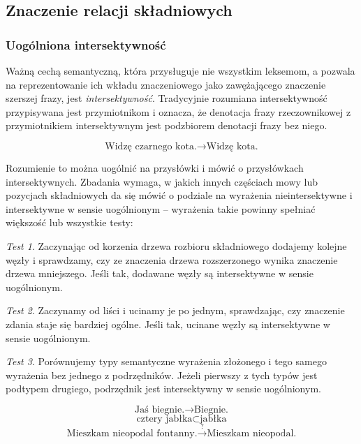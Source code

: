 \documentclass[a4paper, 12pt]{article}
\theoremstyle{remark}
\newtheorem{test}{Test}
\begin{document}
\subsection{Znaczenie relacji składniowych} %

\subsubsection{Uogólniona intersektywność} %
\label{uog_interektywnosc}
Ważną cechą semantyczną, która przysługuje nie wszystkim leksemom, a pozwala na reprezentowanie ich wkładu znaczeniowego jako zawężającego znaczenie szerszej frazy, jest \emph{intersektywność}.
Tradycyjnie rozumiana intersektywność przypisywana jest przymiotnikom i oznacza, że denotacja frazy rzeczownikowej z przymiotnikiem intersektywnym jest podzbiorem denotacji frazy bez niego.

\begin{equation}
\text{Widzę czarnego kota.} \rightarrow \text{Widzę kota.}
\end{equation}


Rozumienie to można uogólnić na przysłówki i mówić o przysłówkach intersektywnych. Zbadania wymaga, w jakich innych częściach mowy lub pozycjach składniowych da się mówić o podziale na wyrażenia nieintersektywne i intersektywne w sensie uogólnionym -- wyrażenia takie powinny spełniać większość lub wszystkie testy:
\begin{test}
Zaczynając od korzenia drzewa rozbioru składniowego dodajemy kolejne węzły i sprawdzamy, czy ze znaczenia drzewa rozszerzonego wynika znaczenie drzewa mniejszego. Jeśli tak, dodawane węzły są intersektywne w sensie uogólnionym.
\end{test}
\begin{test}
Zaczynamy od liści i ucinamy je po jednym, sprawdzając, czy znaczenie zdania staje się bardziej ogólne. Jeśli tak, ucinane węzły są intersektywne w sensie uogólnionym.
\end{test}
\begin{test}
Porównujemy typy semantyczne wyrażenia złożonego i tego samego wyrażenia bez jednego z podrzędników. Jeżeli pierwszy z tych typów jest podtypem drugiego, podrzędnik jest intersektywny w sensie uogólnionym.
\end{test}
\begin{equation}\label{biegnie}
	\text{Jaś biegnie.} \rightarrow \text{Biegnie.}
\end{equation}
\begin{equation}\label{jablka}
	\text{cztery jabłka} \subset \text{jabłka}
\end{equation}
\begin{equation}\label{fontanna}
\text{Mieszkam nieopodal fontanny.} \stackrel{?}{\rightarrow} \text{Mieszkam nieopodal.}
\end{equation}
\end{document}
